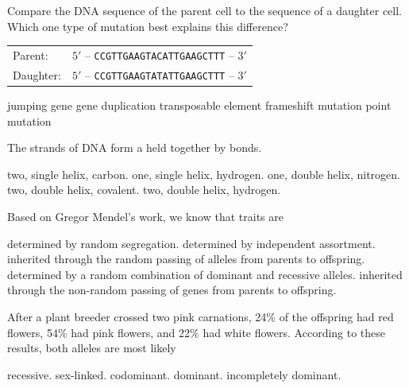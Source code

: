 \question
Compare the DNA sequence of the parent cell to the sequence of a daughter cell.  Which one type of mutation best explains this difference?

\vspace{0.4\baselineskip}
\begin{tabular}{@{}ll@{}}
Parent: & $5'$ -- \texttt{CCGTTGAAGTACATTGAAGCTTT} -- $3'$\\
Daughter: & $5'$ -- \texttt{CCGTTGAAGTATATTGAAGCTTT} -- $3'$\\
\end{tabular}

\begin{choices}
\choice jumping gene
\choice gene duplication
\choice transposable element
\choice frameshift mutation
\correctchoice point mutation
\end{choices}

\question
The \underline{\hspace{2cm}} strands of DNA form a \underline{\hspace{2cm}} held together by \underline{\hspace{2cm}} bonds.

\begin{choices}
\choice two, single helix, carbon.
\choice one, single helix, hydrogen.
\choice one, double helix, nitrogen.
\choice two, double helix, covalent.
\correctchoice two, double helix, hydrogen.
\end{choices}

\question
Based on Gregor Mendel's work, we know that traits are

\begin{choices}
\choice determined by random segregation.
\choice determined by independent assortment.
\correctchoice inherited through the random passing of alleles from parents to offspring.
\choice determined by a random combination of dominant and recessive alleles.
\choice inherited through the non-random passing of genes from parents to offspring.
\end{choices}

\question
After a plant breeder crossed two pink carnations, 24\% of the offspring had red flowers, 54\% had pink flowers, and 22\% had white flowers. According to these results, both alleles are most likely

\begin{choices}
\choice recessive.
\choice sex-linked.
\choice codominant.
\choice dominant.
\correctchoice incompletely dominant.
\end{choices}

